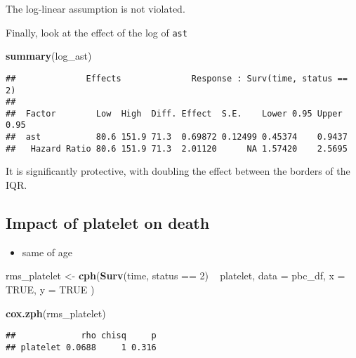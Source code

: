 \documentclass[]{book}
\newenvironment{Shaded}{\begin{snugshade}}{\end{snugshade}}
\newcommand{\KeywordTok}[1]{\textcolor[rgb]{0.13,0.29,0.53}{\textbf{{#1}}}}
\newcommand{\DataTypeTok}[1]{\textcolor[rgb]{0.13,0.29,0.53}{{#1}}}
\newcommand{\DecValTok}[1]{\textcolor[rgb]{0.00,0.00,0.81}{{#1}}}
\newcommand{\StringTok}[1]{\textcolor[rgb]{0.31,0.60,0.02}{{#1}}}
\newcommand{\OtherTok}[1]{\textcolor[rgb]{0.56,0.35,0.01}{{#1}}}
\newcommand{\NormalTok}[1]{{#1}}
\providecommand{\tightlist}{%
  \setlength{\itemsep}{0pt}\setlength{\parskip}{0pt}}
\theoremstyle{definition}
\theoremstyle{definition}
\theoremstyle{definition}
\theoremstyle{remark}
\begin{document}
The log-linear assumption is not violated.

Finally, look at the effect of the log of \texttt{ast}

\begin{Shaded}
\begin{Highlighting}[]
\KeywordTok{summary}\NormalTok{(log_ast)}
\end{Highlighting}
\end{Shaded}

\begin{verbatim}
##              Effects              Response : Surv(time, status == 2) 
## 
##  Factor        Low  High  Diff. Effect  S.E.    Lower 0.95 Upper 0.95
##  ast           80.6 151.9 71.3  0.69872 0.12499 0.45374    0.9437    
##   Hazard Ratio 80.6 151.9 71.3  2.01120      NA 1.57420    2.5695
\end{verbatim}

It is significantly protective, with doubling the effect between the
borders of the IQR.

\subsection{\texorpdfstring{Impact of \textbf{platelet} on
death}{Impact of platelet on death}}\label{platelet2}

\begin{itemize}
\tightlist
\item
  same of age
\end{itemize}

\begin{Shaded}
\begin{Highlighting}[]
\NormalTok{rms_platelet <-}\StringTok{ }\KeywordTok{cph}\NormalTok{(}\KeywordTok{Surv}\NormalTok{(time, status ==}\StringTok{ }\DecValTok{2}\NormalTok{) ~}\StringTok{ }\NormalTok{platelet,}
  \DataTypeTok{data =} \NormalTok{pbc_df,}
  \DataTypeTok{x    =} \OtherTok{TRUE}\NormalTok{,}
  \DataTypeTok{y    =} \OtherTok{TRUE}
\NormalTok{)}

\KeywordTok{cox.zph}\NormalTok{(rms_platelet)}
\end{Highlighting}
\end{Shaded}

\begin{verbatim}
##             rho chisq     p
## platelet 0.0688     1 0.316
\end{verbatim}

\begin{Shaded}
\end{Shaded}
\end{document}

